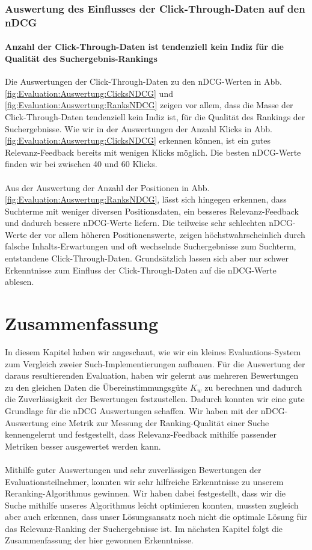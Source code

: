 \subsubsection{Auswertung des Einflusses der Click-Through-Daten auf den nDCG}
\label{sec:Evaluation:Auswertung:Diskussion:EinflussNDCG}

\paragraph{Anzahl der Click-Through-Daten ist tendenziell kein Indiz für die Qualität des Suchergebnis-Rankings}
Die Auswertungen der Click-Through-Daten zu den nDCG-Werten in Abb. \ref{fig:Evaluation:Auswertung:ClicksNDCG} und \ref{fig:Evaluation:Auswertung:RanksNDCG} zeigen vor allem, dass die Masse der Click-Through-Daten tendenziell kein Indiz ist, für die Qualität des Rankings der Suchergebnisse. Wie wir in der Auswertungen der Anzahl Klicks in Abb. \ref{fig:Evaluation:Auswertung:ClicksNDCG} erkennen können, ist ein gutes Relevanz-Feedback bereits mit wenigen Klicks möglich. Die besten nDCG-Werte finden wir bei zwischen 40 und 60 Klicks. 
\\
\\
Aus der Auswertung der Anzahl der Positionen in Abb. \ref{fig:Evaluation:Auswertung:RanksNDCG}, lässt sich hingegen erkennen, dass Suchterme mit weniger diversen Positionsdaten, ein besseres Relevanz-Feedback und dadurch bessere nDCG-Werte liefern. Die teilweise sehr schlechten nDCG-Werte der vor allem höheren Positionenswerte, zeigen höchstwahrscheinlich durch falsche Inhalts-Erwartungen und oft wechselnde Suchergebnisse zum Suchterm, entstandene Click-Through-Daten. Grundsätzlich lassen sich aber nur schwer Erkenntnisse zum Einfluss der Click-Through-Daten auf die nDCG-Werte ablesen.

\section{Zusammenfassung}
\label{sec:Evaluation:Zusammenfassung}

In diesem Kapitel haben wir angeschaut, wie wir ein kleines Evaluations-System zum Vergleich zweier Such-Implementierungen aufbauen. Für die Auswertung der daraus resultierenden Evaluation, haben wir gelernt aus mehreren Bewertungen zu den gleichen Daten die Übereinstimmungsgüte $K_w$ zu berechnen und dadurch die Zuverlässigkeit der Bewertungen festzustellen. Dadurch konnten wir eine gute Grundlage für die nDCG Auswertungen schaffen. Wir haben mit der nDCG-Auswertung eine Metrik zur Messung der Ranking-Qualität einer Suche kennengelernt und festgestellt, dass Relevanz-Feedback mithilfe passender Metriken besser ausgewertet werden kann.
\\
\\
Mithilfe guter Auswertungen und sehr zuverlässigen Bewertungen der Evaluationsteilnehmer, konnten wir sehr hilfreiche Erkenntnisse zu unserem Reranking-Algorithmus gewinnen. Wir haben dabei festgestellt, dass wir die Suche mithilfe unseres Algorithmus leicht optimieren konnten, mussten zugleich aber auch erkennen, dass unser Lösungsansatz noch nicht die optimale Lösung für das Relevanz-Ranking der Suchergebnisse ist. Im nächsten Kapitel folgt die Zusammenfassung der hier gewonnen Erkenntnisse. 